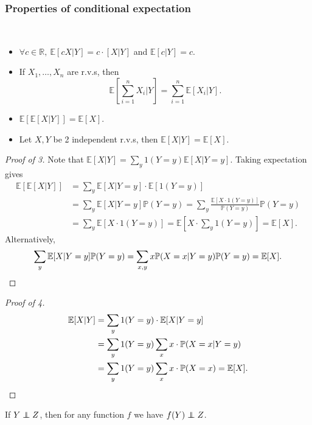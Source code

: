 \subsubsection*{Properties of conditional expectation}
\begin{proposition}\label{prop:Properties of conditional expectation}\ 
    \begin{itemize}
        \item $ \forall c\in \mathbb{R},\ \mathbb{E}[cX|Y]=c \cdot [X|Y] $ and $ \mathbb{E}[c|Y]=c $.
        \item If $ X_1,\dots,X_n $ are r.v.s, then 
        \[
            \mathbb{E}\left[ \sum_{i=1}^{n}X_i\Big|Y \right] = \sum_{i=1}^{n} \mathbb{E}[X_i|Y].
        \]
        \item $ \mathbb{E}[\mathbb{E}[X|Y]]=\mathbb{E}[X] $.
        \item Let $X,Y$ be 2 independent r.v.s, then $ \mathbb{E}[X|Y]=\mathbb{E}[X] $.
    \end{itemize}
\end{proposition}
\begin{proof}[Proof of 3]
    Note that $ \mathbb{E}[X|Y]=\sum_{y} 1(Y=y)\mathbb{E}[X|Y=y] $. Taking expectation gives 
    \begin{align*}
        \mathbb{E}[\mathbb{E}[X|Y]]&= \sum_{y} \mathbb{E}[X|Y=y] \cdot \mathbb{E}[1(Y=y)]\\
        &= \sum_{y} \mathbb{E}[X|Y=y] \mathbb{P}(Y=y) = \sum_{y} \frac{\mathbb{E}[X\cdot 1(Y=y)]}{\mathbb{P}(Y=y)}\mathbb{P}(Y=y)\\ 
        &= \sum_{y} \mathbb{E}[X\cdot 1(Y=y)] = \mathbb{E}\left[ X\cdot \sum_{y} 1(Y=y) \right] = \mathbb{E}[X].
    \end{align*}
    Alternatively,
    \[
        \sum_{y} \mathbb{E}[X|Y=y] \mathbb{P}(Y=y) = \sum_{x,y} x\mathbb{P}(X=x|Y=y)\mathbb{P}(Y=y)=\mathbb{E}[X].\qedhere
    \]
\end{proof}
\begin{proof}[Proof of 4]
    \begin{align*}
        \mathbb{E}[X|Y]&= \sum_{y} 1(Y=y) \cdot \mathbb{E}[X|Y=y]\\ 
        &= \sum_{y} 1(Y=y) \sum_{x} x \cdot \mathbb{P}(X=x|Y=y)\\
        &= \sum_{y} 1(Y=y) \sum_{x} x \cdot \mathbb{P}(X=x) = \mathbb{E}[X].\qedhere
    \end{align*}
\end{proof}
\begin{lemma}\label{lma:2.25}
    If $ Y \independent Z $, then for any function $f$ we have $ f(Y) \independent Z $.
\end{lemma}
